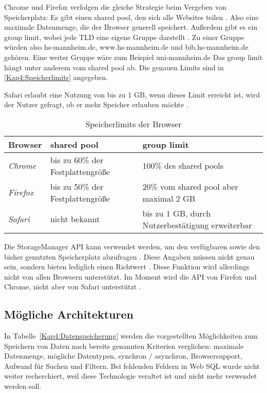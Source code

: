 Chrome und Firefox verfolgen die gleiche Strategie beim Vergeben von Speicherplatz: Es gibt einen shared pool, den sich alle Websites teilen \autocite{storage-for-the-web} \autocite{mdn-browser-storage-limit}. Also eine maximale Datenmenge, die der Browser generell speichert. Außerdem gibt es ein group limit, wobei jede \ac{TLD} eine eigene Gruppe darstellt \autocite{mdn-browser-storage-limit}. Zu einer Gruppe würden also hs-mannheim.de, www.hs-mannheim.de und bib.hs-mannheim.de gehören. Eine weiter Gruppe wäre zum Beispiel uni-mannheim.de Das group limit hängt unter anderem vom shared pool ab. Die genauen Limits sind in \autoref{Kap4:Speicherlimits} angegeben.

Safari erlaubt eine Nutzung von bis zu 1 \ac{GB}, wenn dieses Limit erreicht ist, wird der Nutzer gefragt, ob er mehr Speicher erlauben möchte \autocite{storage-for-the-web}. 

\begin{table}
  \renewcommand{\arraystretch}{1.2}
  \centering
  \sffamily
  \begin{footnotesize}
    \begin{tabular}{l l l}
      \toprule
      \textbf{Browser} & \textbf{shared pool} & \textbf{group limit} \\
      \midrule
      \emph{Chrome} & bis zu 60\% der Festplattengröße & 100\% des shared pools \\
      \emph{Firefox} & bis zu 50\% der Festplattengröße & 20\% vom shared pool aber maximal 2 \ac{GB} \\
      \emph{Safari} & nicht bekannt & bis zu 1 \ac{GB}, durch Nutzerbestätigung erweiterbar \\
      \bottomrule
    \end{tabular}
  \end{footnotesize}
  \rmfamily
  \caption{Speicherlimits der Browser}
  \label{Kap4:Speicherlimits}
\end{table}

Die StorageManager \ac{API} kann verwendet werden, um den verfügbaren sowie den bisher genutzten Speicherplatz abzufragen \autocite{storage-for-the-web}. Diese Angaben müssen nicht genau sein, sondern bieten lediglich einen Richtwert \autocite{storage-for-the-web}. Diese Funktion wird allerdings nicht von allen Browsern unterstützt. Im Moment wird die \ac{API} von Firefox und Chrome, nicht aber von Safari unterstützt \autocite{mdn-storage-api}.

\subsection{Mögliche Architekturen}
In Tabelle~\ref{Kap4:Datenspeicherung} werden die vorgestellten Möglichkeiten zum Speichern von Daten nach bereits genannten Kriterien verglichen: maximale Datenmenge, mögliche Datentypen, synchron / asynchron, Browsersupport, Aufwand für Suchen und Filtern. Bei fehlenden Feldern in Web SQL wurde nicht weiter recherchiert, weil diese Technologie veraltet ist und nicht mehr verwendet werden soll.

